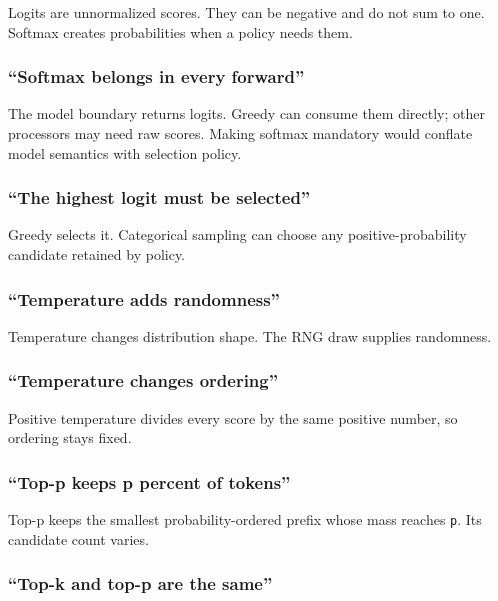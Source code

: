 \documentclass[
  10pt,
]{article}
\begin{document}
Logits are unnormalized scores. They can be negative and do not sum to
one. Softmax creates probabilities when a policy needs them.

\subsubsection{``Softmax belongs in every
forward''}\label{softmax-belongs-in-every-forward}

The model boundary returns logits. Greedy can consume them directly;
other processors may need raw scores. Making softmax mandatory would
conflate model semantics with selection policy.

\subsubsection{``The highest logit must be
selected''}\label{the-highest-logit-must-be-selected}

Greedy selects it. Categorical sampling can choose any
positive-probability candidate retained by policy.

\subsubsection{``Temperature adds
randomness''}\label{temperature-adds-randomness}

Temperature changes distribution shape. The RNG draw supplies
randomness.

\subsubsection{``Temperature changes
ordering''}\label{temperature-changes-ordering}

Positive temperature divides every score by the same positive number, so
ordering stays fixed.

\subsubsection{``Top-p keeps p percent of
tokens''}\label{top-p-keeps-p-percent-of-tokens}

Top-p keeps the smallest probability-ordered prefix whose mass reaches
\texttt{p}. Its candidate count varies.

\subsubsection{``Top-k and top-p are the
same''}\label{top-k-and-top-p-are-the-same}
\end{document}
